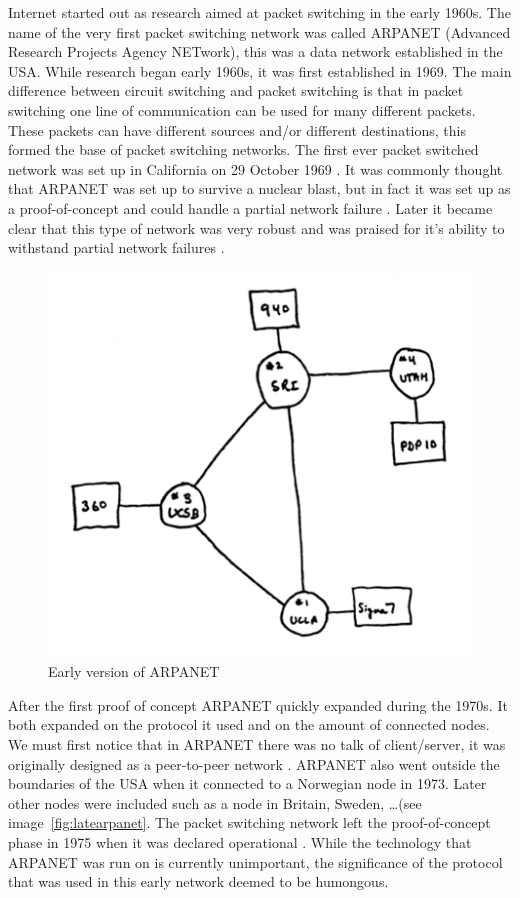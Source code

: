 Internet started out as research aimed at packet switching in the early 1960s. The name of the very first packet switching network was called ARPANET (Advanced Research Projects Agency NETwork), this was a data network established in the USA. While research began early 1960s, it was first established in 1969. The main difference between circuit switching and packet switching is that in packet switching one line of communication can be used for many different packets. These packets can have different sources and/or different destinations, this formed the base of packet switching networks. The first ever packet switched network was set up in California on 29 October 1969 \citep{petersalus1995}. It was commonly thought that ARPANET was set up to survive a nuclear blast, but in fact it was set up as a proof-of-concept and could handle a partial network failure \citep{katiehafner1998}. Later it became clear that this type of network was very robust and was praised for it's ability to withstand partial network failures \citep{janetabbate2000}.
\npar
\begin{figure}[H]
    \centering
    \includegraphics{figures/earlyarpanet}
    \caption{Early version of ARPANET \citep{website:computerhistory}} 
    \label{fig:earlyarpanet}
\end{figure}
\npar
After the first proof of concept ARPANET quickly expanded during the 1970s. It both expanded on the protocol it used and on the amount of connected nodes. We must first notice that in ARPANET there was no talk of client/server, it was originally designed as a peer-to-peer network \citep{petersalus2008, timbernerslee2000}. ARPANET also went outside the boundaries of the USA when it connected to a Norwegian node in 1973. Later other nodes were included such as a node in Britain, Sweden, \ldots (see image~\ref{fig:latearpanet}. The packet switching network left the proof-of-concept phase in 1975 when it was declared operational \citep{petersalus2008}. While the technology that ARPANET was run on is currently unimportant, the significance of the protocol that was used in this early network deemed to be humongous.  
